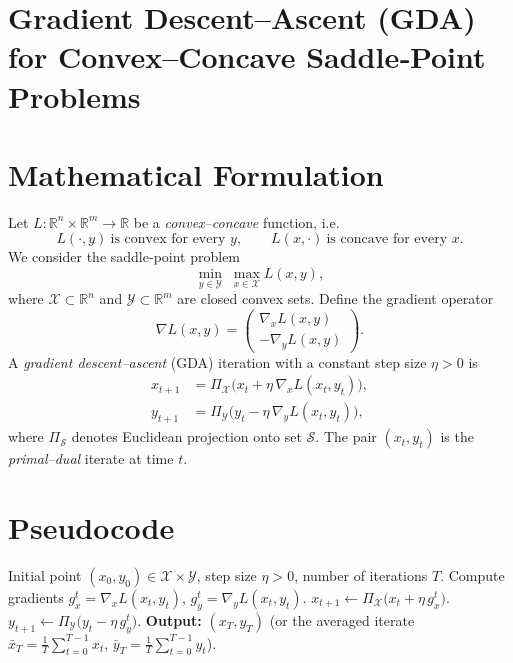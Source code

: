 \documentclass{article}
\begin{document}
\section*{Gradient Descent–Ascent (GDA) for Convex–Concave Saddle‑Point Problems}

\section*{Mathematical Formulation}
Let $L:\mathbb{R}^{n}\times\mathbb{R}^{m}\rightarrow\mathbb{R}$ be a \emph{convex–concave} function, i.e.
\[
L(\cdot ,y)\ \text{is convex for every }y,\qquad 
L(x,\cdot )\ \text{is concave for every }x .
\]
We consider the saddle‑point problem
\[
\min_{y\in\mathcal{Y}}\;\max_{x\in\mathcal{X}} L(x,y),
\]
where $\mathcal{X}\subset\mathbb{R}^{n}$ and $\mathcal{Y}\subset\mathbb{R}^{m}$ are closed convex sets.  
Define the gradient operator
\[
\nabla L(x,y)=\begin{pmatrix}
\nabla_{x}L(x,y)\\[2mm]
-\nabla_{y}L(x,y)
\end{pmatrix}.
\]
A \emph{gradient descent–ascent} (GDA) iteration with a constant step size $\eta>0$ is
\begin{align}
x_{t+1}&= \Pi_{\mathcal{X}}\!\bigl(x_{t}+ \eta\,\nabla_{x}L(x_{t},y_{t})\bigr),\label{eq:update-x}\\
y_{t+1}&= \Pi_{\mathcal{Y}}\!\bigl(y_{t}- \eta\,\nabla_{y}L(x_{t},y_{t})\bigr),\label{eq:update-y}
\end{align}
where $\Pi_{\mathcal{S}}$ denotes Euclidean projection onto set $\mathcal{S}$.
The pair $(x_{t},y_{t})$ is the \emph{primal–dual} iterate at time $t$.

\section*{Pseudocode}
\begin{algorithm}[H]
\caption{Gradient Descent–Ascent (GDA)}\label{alg:GDA}
\begin{algorithmic}[1]
\Require Initial point $(x_{0},y_{0})\in\mathcal{X}\times\mathcal{Y}$, step size $\eta>0$, number of iterations $T$.
    \State Compute gradients $g_{x}^{t}= \nabla_{x}L(x_{t},y_{t})$, $g_{y}^{t}= \nabla_{y}L(x_{t},y_{t})$.
    \State $x_{t+1}\gets \Pi_{\mathcal{X}}\!\bigl(x_{t}+ \eta\, g_{x}^{t}\bigr)$.
    \State $y_{t+1}\gets \Pi_{\mathcal{Y}}\!\bigl(y_{t}- \eta\, g_{y}^{t}\bigr)$.
\EndFor
\State \textbf{Output:} $(x_{T},y_{T})$ (or the averaged iterate $\bar{x}_{T}=\frac1T\sum_{t=0}^{T-1}x_{t}$, $\bar{y}_{T}=\frac1T\sum_{t=0}^{T-1}y_{t}$).
\end{algorithmic}
\end{algorithm}
\end{document}
